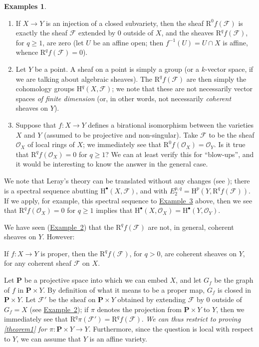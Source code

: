 \documentclass{article}
\theoremstyle{plain}
\newenvironment{theorem}[1]
    {\renewcommand\theinnercustomtheorem{#1}\innercustomtheorem}
    {\endinnercustomtheorem}
\theoremstyle{definition}
\newtheorem*{examples}{Examples}
\newcommand{\sh}[1]{{\mathscr{#1}}}
\newcommand{\HH}{\mathrm{H}}
\newcommand{\RR}{\mathrm{R}}
\newcommand{\PP}{\mathbf{P}}
\renewcommand{\geq}{\geqslant}
\newcommand{\oldpage}[1]{\marginpar{\footnotesize$\Big\vert$ \textit{p.~#1}}}
\begin{document}
\begin{examples}
  \begin{enumerate}
    \item If $X\to Y$ is an injection of a closed subvariety, then the sheaf $\RR^0f(\sh{F})$ is exactly the sheaf $\sh{F}$ extended by $0$ outside of $X$, and the sheaves $\RR^qf(\sh{F})$, for $q\geq1$, are zero (let $U$ be an affine open; then $f^{-1}(U)=U\cap X$ is affine, whence $\RR^qf(\sh{F})=0$).
      \label{example1}
    \item Let $Y$ be a point.
      A sheaf on a point is simply a group (or a $k$-vector space, if we are talking about algebraic sheaves).
      The $\RR^qf(\sh{F})$ are then simply the cohomology groups $\HH^q(X,\sh{F})$;
      we note that these are not necessarily vector spaces \emph{of finite dimension} (or, in other words, not necessarily \emph{coherent} sheaves on $Y$).
        \label{example2}
    \item Suppose that $f\colon X\to Y$ defines a birational isomorphism between the varieties $X$ and $Y$ (assumed to be projective and non-singular).
      Take $\sh{F}$ to be the sheaf $\sh{O}_X$ of local rings of $X$;
      we immediately see that $\RR^0f(\sh{O}_X)=\sh{O}_Y$.
      Is it true that $\RR^qf(\sh{O}_X)=0$ for $q\geq1$?
      We can at least verify this for ``blow-ups'', and it would be interesting to know the answer in the general case.
      \label{example3}
  \end{enumerate}
\end{examples}

We note that Leray's theory can be translated without any changes (see \cite{7});
there is a spectral sequence abutting $\HH^\bullet(X,\sh{F})$, and with $E_2^{p,q}=\HH^p(Y,\RR^qf(\sh{F}))$.
If we apply, for example, this spectral sequence
\oldpage{103}
to \hyperref[example3]{Example~3} above, then we see that $\RR^qf(\sh{O}_X)=0$ for $q\geq1$ implies that $\HH^\bullet(X,\sh{O}_X)=\HH^\bullet(Y,\sh{O}_Y)$.

We have seen (\hyperref[example2]{Example~2}) that the $\RR^qf(\sh{F})$ are not, in general, coherent sheaves on $Y$.
However:

\begin{theorem}{1}
\label{theorem1}
  If $f\colon X\to Y$ is proper, then the $\RR^qf(\sh{F})$, for $q>0$, are coherent sheaves on $Y$, for any coherent sheaf $\sh{F}$ on $X$.
\end{theorem}

Let $\PP$ be a projective space into which we can embed $X$, and let $G_f$ be the graph of $f$ in $\PP\times Y$.
By definition of what it means to be a proper map, $G_f$ is closed in $\PP\times Y$.
Let $\sh{F}'$ be the sheaf on $\PP\times Y$ obtained by extending $\sh{F}$ by $0$ outside of $G_f=X$ (see \hyperref[example2]{Example~2});
if $\pi$ denotes the projection from $\PP\times Y$ to $Y$, then we immediately see that $\RR^q\pi(\sh{F}')=\RR^qf(\sh{F})$.
\emph{We can thus restrict to proving \cref{theorem1} for $\pi\colon \PP\times Y\to Y$}.
Furthermore, since the question is local with respect to $Y$, we can assume that $Y$ is an affine variety.
\end{document}

